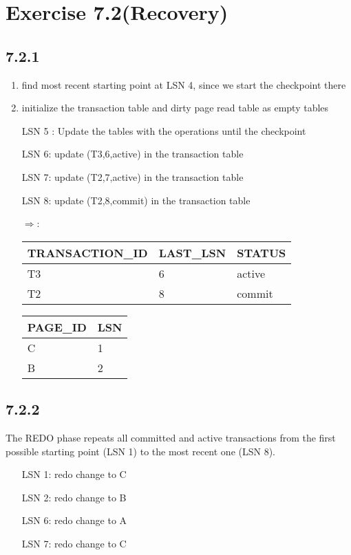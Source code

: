 \documentclass[12pt]{article}
\begin{document}
	\section*{Exercise 7.2(Recovery)}
	\subsection*{7.2.1}
		\begin{enumerate}
			\setlength{\itemindent}{1cm}
			\item find most recent starting point at LSN 4, since we start the checkpoint there
			\item initialize the transaction table and dirty page read table as empty tables
			\item[LSN 5]: Update the tables with the operations until the checkpoint
			\item[LSN 6:] update (T3,6,active) in the transaction table
			\item[LSN 7:] update (T2,7,active) in the transaction table
			\item[LSN 8:] update (T2,8,commit) in the transaction table
			\item[$\Rightarrow$:]
				\begin{minipage}{0.65\textwidth}
					\begin{tabular}{l | l | l}
						TRANSACTION\_ID & LAST\_LSN & STATUS \\\hline
						T3 & 6 & active \\
						T2 & 8 & commit
					\end{tabular}
				\end{minipage}
				\begin{minipage}{0.45\textwidth}
					\begin{tabular}{l | l }
						PAGE\_ID & LSN\\\hline
						C & 1 \\
						B & 2
					\end{tabular}
				\end{minipage}
				\hfill
		\end{enumerate}		
	\subsection*{7.2.2}
		The REDO phase repeats all committed and active transactions from the first possible starting point (LSN 1) to the most recent one (LSN 8).
		\begin{itemize}
			\setlength{\itemindent}{1cm}
			\item[LSN 1:] redo change to C
			\item[LSN 2:] redo change to B
			\item[LSN 6:] redo change to A
			\item[LSN 7:] redo change to C			
		\end{itemize}	
\end{document}
